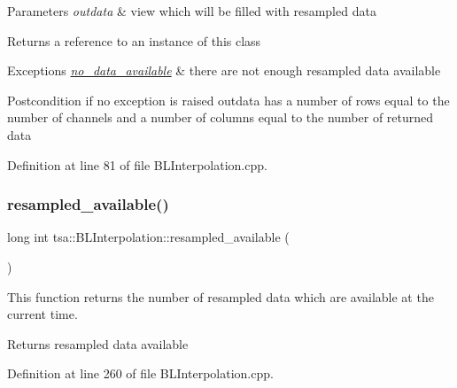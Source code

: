 \begin{DoxyParams}{Parameters}
{\em outdata} & view which will be filled with resampled data\\
\hline
\end{DoxyParams}
\begin{DoxyReturn}{Returns}
a reference to an instance of this class
\end{DoxyReturn}

\begin{DoxyExceptions}{Exceptions}
{\em \hyperlink{classtsa_1_1no__data__available}{no\+\_\+data\+\_\+available}} & there are not enough resampled data available\\
\hline
\end{DoxyExceptions}
\begin{DoxyPostcond}{Postcondition}
if no exception is raised outdata has a number of rows equal to the number of channels and a number of columns equal to the number of returned data 
\end{DoxyPostcond}


Definition at line 81 of file B\+L\+Interpolation.\+cpp.

\mbox{\label{classtsa_1_1_b_l_interpolation_adfb54e2b5bd52c05c3caaf062f97d9b6}} 
\subsubsection{\texorpdfstring{resampled\+\_\+available()}{resampled\_available()}}
{\footnotesize\ttfamily long int tsa\+::\+B\+L\+Interpolation\+::resampled\+\_\+available (\begin{DoxyParamCaption}{ }\end{DoxyParamCaption})\hspace{0.3cm}{\ttfamily [private]}}

This function returns the number of resampled data which are available at the current time.

\begin{DoxyReturn}{Returns}
resampled data available 
\end{DoxyReturn}


Definition at line 260 of file B\+L\+Interpolation.\+cpp.

\mbox{\label{classtsa_1_1_b_l_interpolation_ac8a67161f8c0aeb39ced9d36664860ba}} 
